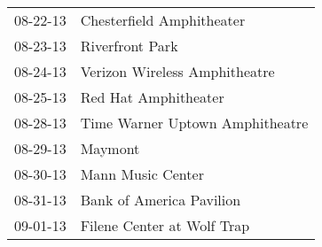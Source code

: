 \begin{supertabular}{p{0.25\columnwidth}p{0.75\columnwidth}}
 08-22-13 &        Chesterfield Amphitheater \\
 08-23-13 &                  Riverfront Park \\
 08-24-13 &    Verizon Wireless Amphitheatre \\
 08-25-13 &             Red Hat Amphitheater \\
 08-28-13 &  Time Warner Uptown Amphitheatre \\
 08-29-13 &                          Maymont \\
 08-30-13 &                Mann Music Center \\
 08-31-13 &         Bank of America Pavilion \\
 09-01-13 &       Filene Center at Wolf Trap \\
\end{supertabular}
